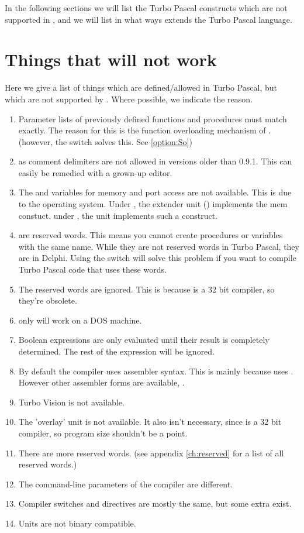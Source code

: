 \documentclass{report}
\newcommand{\seeo}[1]{See \ref{option:#1}}
\begin{document}
In the following sections we will list the Turbo Pascal constructs which are
not supported in \fpc, and we will list in what ways \fpc extends the Turbo
Pascal language.


\section{Things that will not work}
Here we give a list of things which are defined/allowed in Turbo Pascal, but
which are not supported by \fpc. Where possible, we indicate the reason. 
\begin{enumerate}
\item Parameter lists of previously defined functions and procedures must
match exactly. The reason for this is the function overloading mechanism of
\fpc. (however, the  switch solves this. \seeo{So})
\item {} as comment delimiters are not allowed in versions
older than 0.9.1. This can easily be remedied with a grown-up editor. 
\item The  and  variables for memory and port
access are not available. This is due to the operating system. Under
\dos, the extender unit () implements the mem constuct.
under \linux, the  unit implements such a construct.
\item {} 
are reserved words. This means you cannot create procedures or variables 
with the same name. While they are not reserved words in Turbo Pascal, 
they are in Delphi. Using the  switch will solve this problem if
you want to compile Turbo Pascal code that uses these words.
\item The reserved words  are ignored. This is
because \fpc is a 32 bit compiler, so they're obsolete.
\item {} only will work on a DOS machine.
\item Boolean expressions are only evaluated until their result is completely
determined. The rest of the expression will be ignored.
\item By default the compiler uses   assembler syntax. 
This is mainly because \fpc uses \gnu {}. However other assembler
forms are available, \progref.
\item Turbo Vision is not available.
\item The 'overlay' unit is not available. It also isn't necessary, since
\fpc is a 32 bit compiler, so program size shouldn't be a point.
\item There are more reserved words. (see appendix \ref{ch:reserved} for a
list of all reserved words.)
\item The command-line parameters of the compiler are different.
\item Compiler switches and directives are mostly the same, but some extra
exist.
\item Units are not binary compatible.
\end{enumerate}
\end{document}
